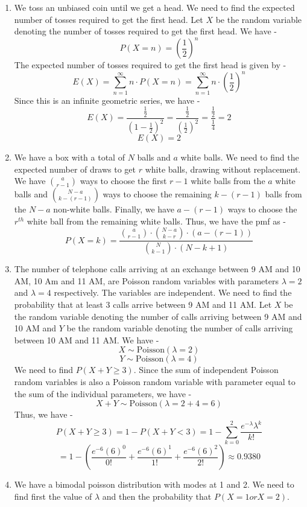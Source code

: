\begin{enumerate}
    \[\boxed{n = 8
    }\]
    \item We toss an unbiased coin until we get a head. We need to find the expected number of tosses required to get the first head.
    Let $X$ be the random variable denoting the number of tosses required to get the first head. We have -
    \[P(X = n) = \left(\frac{1}{2}\right)^n\]
    The expected number of tosses required to get the first head is given by -
    \[E(X) = \sum_{n=1}^{\infty} n \cdot P(X=n) = \sum_{n=1}^{\infty} n \cdot \left(\frac{1}{2}\right)^n\]
    Since this is an infinite geometric series, we have -
    \[E(X) = \frac{\frac{1}{2}}{(1 - \frac{1}{2})^2} = \frac{\frac{1}{2}}{\left(\frac{1}{2}\right)^2} = \frac{\frac{1}{2}}{\frac{1}{4}} = 2\]
    \[\boxed{E(X) = 2
    }\]
    \item We have a box with a total of $N$ balls and $a$ white balls. We need to find the expected number of draws to get $r$ white balls, drawing without replacement. We have $\binom{a}{r-1}$ ways to choose the first $r-1$ white balls from the $a$ white balls and $\binom{N-a}{k-(r-1)}$ ways to choose the remaining $k-(r-1)$ balls from the $N-a$ non-white balls. Finally, we have $a - (r-1)$ ways to choose the $r^{th}$ white ball from the remaining white balls. Thus, we have the pmf as -
    \[\boxed{P(X = k) = \frac{\binom{a}{r-1} \cdot \binom{N-a}{k-r} \cdot (a - (r-1))}{\binom{N}{k-1} \cdot (N-k+1)}}\]
    \item The number of telephone calls arriving at an exchange between 9 AM and 10 AM, 10 Am and 11 AM, are Poisson random variables with parameters $\lambda = 2$ and $\lambda = 4$ respectively. The variables are independent. We need to find the probability that at least 3 calls arrive between 9 AM and 11 AM.
    Let $X$ be the random variable denoting the number of calls arriving between 9 AM and 10 AM and $Y$ be the random variable denoting the number of calls arriving between 10 AM and 11 AM. We have -
    \[X \sim \text{Poisson}(\lambda = 2)\]
    \[Y \sim \text{Poisson}(\lambda = 4)\]
    We need to find $P(X + Y \geq 3)$. Since the sum of independent Poisson random variables is also a Poisson random variable with parameter equal to the sum of the individual parameters, we have -
    \[X + Y \sim \text{Poisson}(\lambda = 2 + 4 = 6)\]
    Thus, we have -
    \[P(X + Y \geq 3) = 1 - P(X + Y < 3) = 1 - \sum_{k=0}^{2} \frac{e^{-\lambda} \lambda^k}{k!}\]
    \[\boxed{= 1 - \left(\frac{e^{-6} (6)^0}{0!} + \frac{e^{-6} (6)^1}{1!} + \frac{e^{-6} (6)^2}{2!}\right) \approx 0.9380
    }\]
    \item We have a bimodal poisson distribution with modes at 1 and 2. We need to find first the value of $\lambda$ and then the probability that $P(X=1 or X=2)$.

\end{enumerate}
